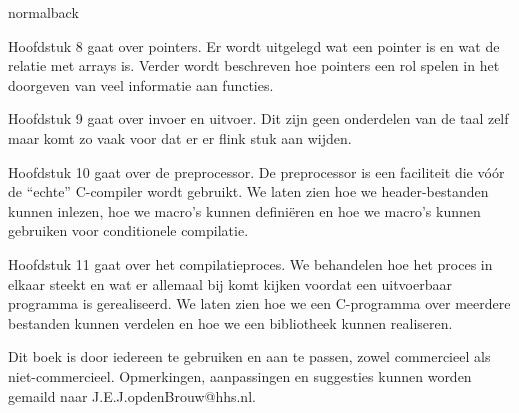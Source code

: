 \documentclass[spinewidth=10.44mm]{bookcover}
\begin{document}
\begin{bookcover}
\begin{bookcoverelement}{normal}{back}
{Hoofdstuk 8 gaat over pointers. Er wordt uitgelegd wat een pointer is en wat de relatie met arrays is. Verder wordt beschreven hoe pointers een rol spelen in het doorgeven van veel informatie aan functies.

Hoofdstuk 9 gaat over invoer en uitvoer. Dit zijn geen onderdelen van de taal zelf maar komt zo vaak voor dat er er flink stuk aan wijden.

Hoofdstuk 10 gaat over de preprocessor. De preprocessor is een faciliteit die vóór de ``echte'' C-compiler wordt gebruikt. We laten zien hoe we header-bestanden kunnen inlezen, hoe we macro's kunnen definiëren en hoe we macro's kunnen gebruiken voor conditionele compilatie.

Hoofdstuk 11 gaat over het compilatieproces. We behandelen hoe het proces in elkaar steekt en wat er allemaal bij komt kijken voordat een uitvoerbaar programma is gerealiseerd. We laten zien hoe we een C-programma over meerdere bestanden kunnen verdelen en hoe we een bibliotheek kunnen realiseren.

Dit boek is door iedereen te gebruiken en aan te passen, zowel commercieel als niet-commercieel. Opmerkingen, aanpassingen en suggesties kunnen worden gemaild naar J.E.J.opdenBrouw@hhs.nl.
}
\vfill
\end{bookcoverelement}
\end{bookcover}
\end{document}
